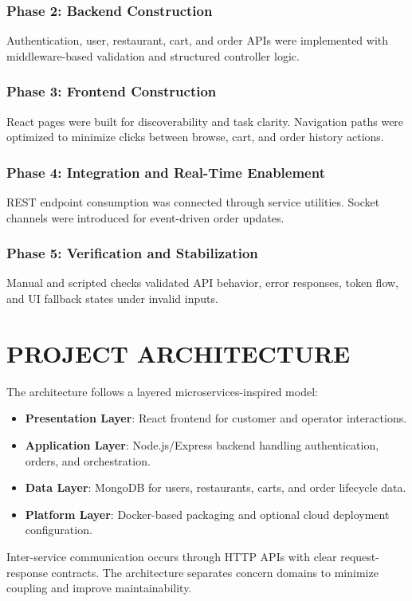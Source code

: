 \documentclass[12pt,a4paper]{report}
\begin{document}
\subsection{Phase 2: Backend Construction}
Authentication, user, restaurant, cart, and order APIs were implemented with middleware-based validation and structured controller logic.

\subsection{Phase 3: Frontend Construction}
React pages were built for discoverability and task clarity. Navigation paths were optimized to minimize clicks between browse, cart, and order history actions.

\subsection{Phase 4: Integration and Real-Time Enablement}
REST endpoint consumption was connected through service utilities. Socket channels were introduced for event-driven order updates.

\subsection{Phase 5: Verification and Stabilization}
Manual and scripted checks validated API behavior, error responses, token flow, and UI fallback states under invalid inputs.

\chapter{PROJECT ARCHITECTURE}
The architecture follows a layered microservices-inspired model:

\begin{itemize}
    \item \textbf{Presentation Layer}: React frontend for customer and operator interactions.
    \item \textbf{Application Layer}: Node.js/Express backend handling authentication, orders, and orchestration.
    \item \textbf{Data Layer}: MongoDB for users, restaurants, carts, and order lifecycle data.
    \item \textbf{Platform Layer}: Docker-based packaging and optional cloud deployment configuration.
\end{itemize}

Inter-service communication occurs through HTTP APIs with clear request-response contracts. The architecture separates concern domains to minimize coupling and improve maintainability.
\end{document}
